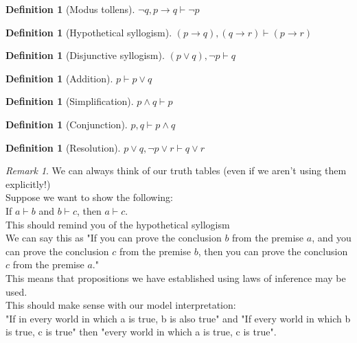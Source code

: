 \documentclass[letterpaper,10pt]{article}
\theoremstyle{plain}
\theoremstyle{definition}
\newtheorem{defn}[thm]{Definition}
\theoremstyle{remark}
\newtheorem{rem}[thm]{Remark}
\providecommand{\land}{\ensuremath{\wedge}}
\providecommand{\lor}{\ensuremath{\vee}}
\begin{document}
\begin{defn}[Modus tollens]
$\lnot q,p\to q \vdash \lnot p$
\end{defn}
\begin{defn}[Hypothetical syllogism]
$(p \to q) , (q \to r) \vdash (p \to r)$
\end{defn}
\begin{defn}[Disjunctive syllogism]
$(p \lor q),\lnot p \vdash q$
\end{defn}
\begin{defn}[Addition]
$p \vdash p \lor q$
\end{defn}
\begin{defn}[Simplification]
$p \land q\vdash p$
\end{defn}
\begin{defn}[Conjunction]
$p,q \vdash p \land q$
\end{defn}
\begin{defn}[Resolution]
$p \lor q, \lnot p \lor r  \vdash q \lor r$
\end{defn}
\newpage 
\begin{rem}
We can always think of our truth tables (even if we aren't using them explicitly!)\\
Suppose we want to show the following:\\
If $a\vdash b$ and $b \vdash c$, then $a\vdash c$. \\
This should remind you of the hypothetical syllogism\\
We can say this as "If you can prove the conclusion $b$ from the premise $a$, and you can prove the conclusion $c$ from the premise $b$, then you can prove the conclusion $c$ from the premise $a$."
\\
This means that propositions we have established using laws of inference may be used.
\\
This should make sense with our model interpretation:\\
"If in every world in which a is true, b is also true" and "If every world in which b is true, c is true" then "every world in which a is true, c is true". 
\\
\end{rem}
\end{document}
